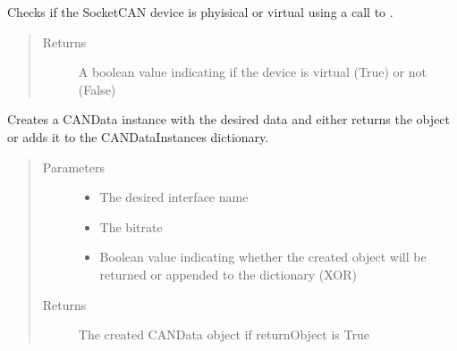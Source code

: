 \documentclass[letterpaper,10pt,english]{sphinxmanual}
\begin{document}
\begin{fulllineitems}
\begin{fulllineitems}
\end{fulllineitems}


\begin{fulllineitems}
\label{\detokenize{src:src.CANData.CANData.checkVCAN}}
Checks if the SocketCAN device is phyisical or virtual using a  call to .
\begin{quote}\begin{description}
\item[{Returns}] \leavevmode
A boolean value indicating if the device is virtual (True) or not (False)

\end{description}\end{quote}

\end{fulllineitems}


\begin{fulllineitems}
\label{\detokenize{src:src.CANData.CANData.createCANDataInstance}}
Creates a CANData instance with the desired data and either returns the object
or adds it to the CANDataInstances dictionary.
\begin{quote}\begin{description}
\item[{Parameters}] \leavevmode\begin{itemize}
\item {} 
 \textendash{} The desired interface name

\item {} 
 \textendash{} The bitrate

\item {} 
 \textendash{} Boolean value indicating whether the created object will be
returned or appended to the dictionary (XOR)

\end{itemize}

\item[{Returns}] \leavevmode
The created CANData object if returnObject is True


\end{description}
\end{quote}
\end{fulllineitems}
\end{fulllineitems}
\end{document}
